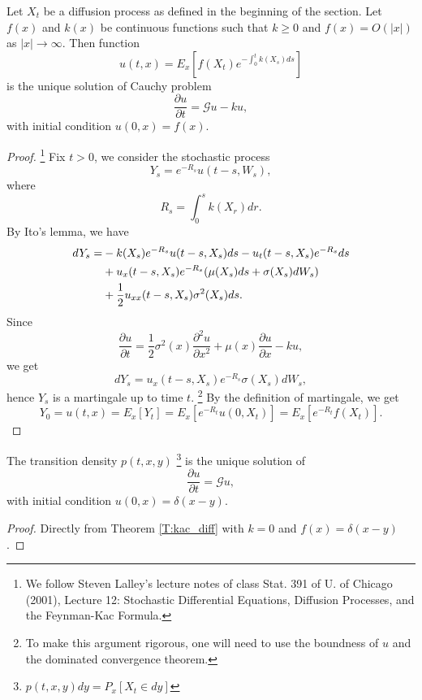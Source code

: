 \begin{theorem} \label{T:kac_diff}
Let $X_t$ be a diffusion process as defined in the beginning of the section.
Let $f(x)$ and $k(x)$ be continuous functions such that $k\ge 0$ and $f(x)=O(|x|)$
as $|x|\rightarrow \infty$. Then function
\begin{equation}
  u(t,x)=E_x  \left[ f(X_t) e^{-\int_0^t k(X_s) ds} \right]
\end{equation}
is the unique solution of Cauchy problem
\begin{equation}
  \frac{\partial u}{\partial t}=\mathcal{G} u - k u,
\end{equation}
with initial condition $u(0,x)=f(x)$.
\end{theorem}
\begin{proof}
\footnote{
We follow Steven Lalley's lecture notes of class Stat. 391 of U. of Chicago
(2001), Lecture 12: Stochastic Differential Equations, Diffusion Processes, and 
the Feynman-Kac Formula. }
Fix $t>0$, we consider the stochastic process
\[
  Y_s = e^{-R_s} u(t-s,W_s),
\]
where
\[
  R_s = \int_0^s k(X_r) dr.
\]
By Ito's lemma, we have
\begin{align*}
  dY_s = 
       &-k(X_s) e^{-R_s} u(t-s,X_s) ds - u_t(t-s,X_s) e^{-R_s} ds \notag\\
       &+ u_x(t-s,X_s) e^{-R_s} (\mu(X_s)ds+\sigma(X_s)dW_s)  \notag \\
       &+ \frac{1}{2} u_{xx}(t-s,X_s) \sigma^2(X_s) ds.      \notag \\
\end{align*}
Since
\[
  \frac{\partial u}{\partial t} 
    = \frac{1}{2} \sigma^2(x) \frac{\partial^2 u}{\partial x^2} 
      + \mu(x) \frac{\partial u}{\partial x} - k u,
\]
we get
\[
  dY_s = u_x(t-s,X_s) e^{-R_s} \sigma(X_s) dW_s,
\]
hence $Y_s$ is a martingale up to time $t$.
\footnote{To make this argument rigorous, one will need to use the boundness of
    $u$ and the dominated convergence theorem.}
By the definition of martingale, we get
\[
  Y_0 = u(t,x) = E_x[Y_t] = E_x \left[e^{-R_t} u(0,X_t) \right]
      = E_x \left[e^{-R_t} f(X_t) \right].
\]
\end{proof}

\begin{proposition} \label{P:kac_tran}
The transition density $p(t,x,y)$ 
\footnote{$p(t,x,y)dy=P_x[X_t\in dy]$}
is the unique solution of
\begin{equation}
  \frac{\partial u}{\partial t}=\mathcal{G} u,
\end{equation}
with initial condition $u(0,x)=\delta(x-y)$.
\end{proposition}
\begin{proof}
Directly from Theorem \ref{T:kac_diff} with $k=0$ and $f(x)=\delta(x-y)$.
\end{proof}


